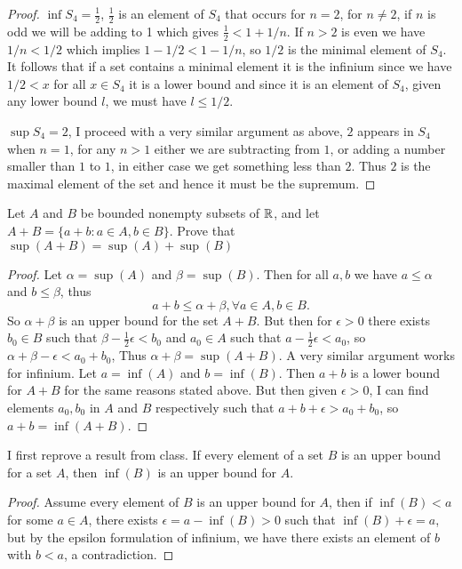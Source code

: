 \begin{proof}
$\inf S_4 = \frac{1}{2}$, $\frac{1}{2}$ is an element of $S_4$ that occurs for $n = 2$, for $n \neq 2$, if $n$ is odd we will be adding to 1 which 
gives $\frac{1}{2} < 1 + 1/n$. If $n>2$ is even we have $1/n < 1/2$ which implies $1 - 1/2 < 1 - 1/n$, so $1/2$ is the minimal element of $S_4$. It follows that 
if a set contains a minimal element it is the infinium since we have $1/2 < x$ for all $x \in S_4$ it is a lower bound and since it is an element of $S_4$, given any lower bound $l$, we must 
have $l \leq 1/2$. 

$\sup S_4 = 2$, I proceed with a very similar argument as above, $2$ appears in $S_4$ when $n=1$, for any $n>1$ either we are subtracting from $1$, or adding a number smaller than $1$ to $1$, in either case 
we get something less than $2$. Thus $2$ is the maximal element of the set and hence it must be the supremum. 
\end{proof}


\question 
Let $A$ and $B$ be bounded nonempty subsets of $\mathbb{R}$, and let $A + B = \{a + b: a \in A, b \in B\}$. 
Prove that $\sup(A+B) = \sup(A) + \sup(B)$ 

\begin{proof}
    Let $\alpha = \sup (A)$ and $\beta = \sup (B)$. Then for all $a, b$ we have 
    $a \leq \alpha$ and $b \leq \beta$, thus 
    \[a + b \leq \alpha + \beta, \forall a \in A, b \in B. \] 
    So $\alpha + \beta $ is an upper bound for the set $A + B$. But then for $\epsilon > 0$ there exists $b_0 \in B$ such that 
    $ \beta - \frac{1}{2}\epsilon < b_0$ and $a_0 \in A$ such that $a - \frac{1}{2}\epsilon < a_0$, so $\alpha + \beta - \epsilon < a_0 + b_0$,
    Thus $\alpha + \beta = \sup( A + B)$. 
    A very similar argument works for infinium. Let $a = \inf(A)$ and $b = \inf(B)$. Then $a + b$ is a lower bound for $A + B$ for the same reasons stated above. 
    But then given $\epsilon > 0$, I can find elements $a_0, b_0$ in $A$ and $B$ respectively such that $a + b + \epsilon > a_0 + b_0$, so 
    $a + b = \inf(A + B)$. 
\end{proof}

\question 
I first reprove a result from class. If every element of a set $B$ is an upper bound for a set $A$, then $\inf(B)$ is an upper bound for $A$. 
\begin{proof}
    Assume every element of $B$ is an upper bound for $A$, then if $\inf(B) < a$ for some $a \in A$, there exists $\epsilon = a - \inf(B) > 0$ such that $\inf(B) + \epsilon = a$, but 
    by the epsilon formulation of infinium, we have there exists an element of $b$ with $b < a$, a contradiction. 
\end{proof}

